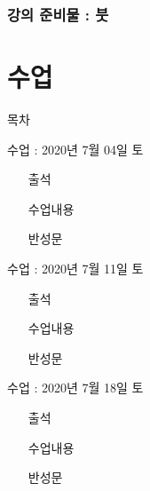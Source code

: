 \documentclass[aspectratio=1610,17pt,xcolor=pdftex,dvipsnames,table,handout]{beamer}
\begin{document}
%
	\section{강의 준비물 : 붓}
	\frame [plain] {\sectionpage}


		\part{ 수업 }
		\frame{\partpage}
		
		\begin{frame} [plain]{목차}
		\tableofcontents%
		\end{frame}


		\begin{frame} [t,plain]
			\begin{block} {수업 : 2020년 7월 04일 토}

			\setlength{\leftmargini}{5em}			
			\begin{itemize}
				\item [출석] 
				\item [수업내용] 
				\item [반성문] 
			\end{itemize}
			\end{block}
		\end{frame}


		\begin{frame} [t,plain]
			\begin{block} {수업 : 2020년 7월 11일 토}

			\setlength{\leftmargini}{5em}			
			\begin{itemize}
				\item [출석] 
				\item [수업내용] 
				\item [반성문] 
			\end{itemize}
			\end{block}
		\end{frame}

		\begin{frame} [t,plain]
			\begin{block} {수업 : 2020년 7월 18일 토}

			\setlength{\leftmargini}{5em}			
			\begin{itemize}
				\item [출석] 
				\item [수업내용] 
				\item [반성문] 
			\end{itemize}
			\end{block}
		\end{frame}
\end{document}
